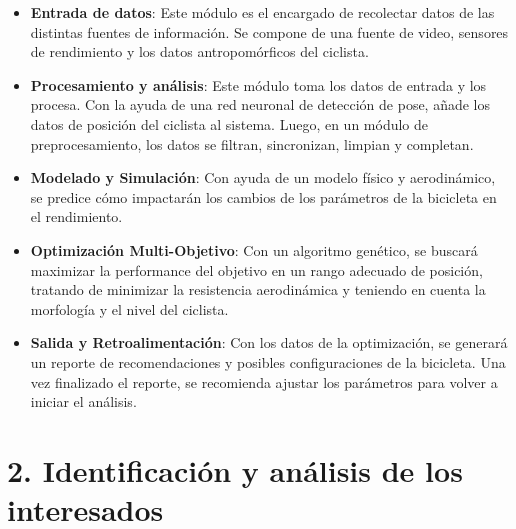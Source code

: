 \documentclass[
11pt, %
]{charter}
\begin{document}
\begin{itemize}
\item \textbf{Entrada de datos}: Este módulo es el encargado de recolectar datos de las distintas fuentes de información. Se compone de una fuente de video, sensores de rendimiento y los datos antropomórficos del ciclista.
\item \textbf{Procesamiento y análisis}: Este módulo toma los datos de entrada y los procesa. Con la ayuda de una red neuronal de detección de pose, añade los datos de posición del ciclista al sistema. Luego, en un módulo de preprocesamiento, los datos se filtran, sincronizan, limpian y completan.
\item \textbf{Modelado y Simulación}: Con ayuda de un modelo físico y aerodinámico, se predice cómo impactarán los cambios de los parámetros de la bicicleta en el rendimiento.
\item \textbf{Optimización Multi-Objetivo}: Con un algoritmo genético, se buscará maximizar la performance del objetivo en un rango adecuado de posición, tratando de minimizar la resistencia aerodinámica y teniendo en cuenta la morfología y el nivel del ciclista.
\item \textbf{Salida y Retroalimentación}: Con los datos de la optimización, se generará un reporte de recomendaciones y posibles configuraciones de la bicicleta. Una vez finalizado el reporte, se recomienda ajustar los parámetros para volver a iniciar el análisis.
\end{itemize}




\section{2. Identificación y análisis de los interesados}
\label{sec:interesados}
\end{document}
